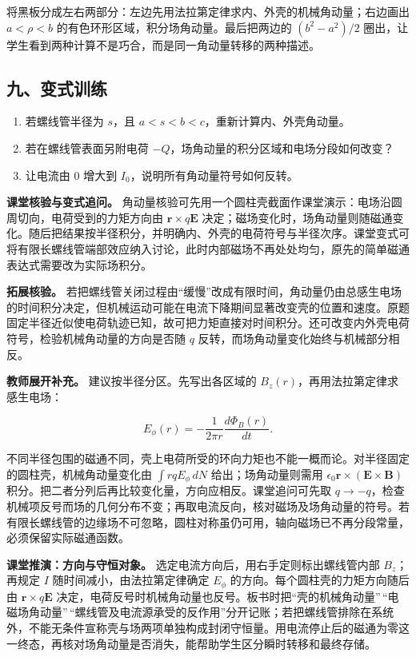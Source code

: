 \documentclass[12pt,a4paper,UTF8]{ctexart}
\newcommand{\tightlist}{\setlength{\itemsep}{0pt}\setlength{\parskip}{0pt}}
\begin{document}
将黑板分成左右两部分：左边先用法拉第定律求内、外壳的机械角动量；右边画出
\(a<\rho<b\) 的有色环形区域，积分场角动量。最后把两边的 \((b^2-a^2)/2\)
圈出，让学生看到两种计算不是巧合，而是同一角动量转移的两种描述。

\subsection{九、变式训练}\label{ux4e5dux53d8ux5f0fux8badux7ec3-2}

\begin{enumerate}
\def\labelenumi{\arabic{enumi}.}
\tightlist
\item
  若螺线管半径为 \(s\)，且 \(a<s<b<c\)，重新计算内、外壳角动量。
\item
  若在螺线管表面另附电荷 \(-Q\)，场角动量的积分区域和电场分段如何改变？
\item
  让电流由 \(0\) 增大到 \(I_0\)，说明所有角动量符号如何反转。
\end{enumerate}

\textbf{课堂核验与变式追问。}
角动量核验可先用一个圆柱壳截面作课堂演示：电场沿圆周切向，电荷受到的力矩方向由
\(\boldsymbol r\times q\boldsymbol E\)
决定；磁场变化时，场角动量则随磁通变化。随后把结果按半径积分，并明确内、外壳的电荷符号与半径次序。课堂变式可将有限长螺线管端部效应纳入讨论，此时内部磁场不再处处均匀，原先的简单磁通表达式需要改为实际场积分。

\textbf{拓展核验。}
若把螺线管关闭过程由``缓慢''改成有限时间，角动量仍由总感生电场的时间积分决定，但机械运动可能在电流下降期间显著改变壳的位置和速度。原题固定半径近似使电荷轨迹已知，故可把力矩直接对时间积分。还可改变内外壳电荷符号，检验机械角动量的方向是否随
\(q\) 反转，而场角动量变化始终与机械部分相反。

\textbf{教师展开补充。} 建议按半径分区。先写出各区域的
\(B_z(r)\)，再用法拉第定律求感生电场：

\[
E_\phi(r)=-\frac{1}{2\pi r}\frac{d\Phi_B(r)}{dt}.
\]

不同半径包围的磁通不同，壳上电荷所受的环向力矩也不能一概而论。对半径固定的圆柱壳，机械角动量变化由
\(\int r q E_\phi\,dN\) 给出；场角动量则需用
\(\epsilon_0\boldsymbol r\times(\boldsymbol E\times\boldsymbol B)\)
积分。把二者分列后再比较变化量，方向应相反。课堂追问可先取
\(q\to-q\)，检查机械项反号而场的几何分布不变；再取电流反向，核对磁场及场角动量的符号。若有限长螺线管的边缘场不可忽略，圆柱对称虽仍可用，轴向磁场已不再分段常量，必须保留实际磁通函数。

\textbf{课堂推演：方向与守恒对象。}
选定电流方向后，用右手定则标出螺线管内部 \(B_z\)；再规定 \(I\)
随时间减小，由法拉第定律确定 \(E_\phi\)
的方向。每个圆柱壳的力矩方向随后由
\(\boldsymbol r\times q\boldsymbol E\)
决定，电荷反号时机械角动量也反号。板书时把``壳的机械角动量''\,``电磁场角动量''\,``螺线管及电流源承受的反作用''分开记账；若把螺线管排除在系统外，不能无条件宣称壳与场两项单独构成封闭守恒量。用电流停止后的磁通为零这一终态，再核对场角动量是否消失，能帮助学生区分瞬时转移和最终存储。
\end{document}
